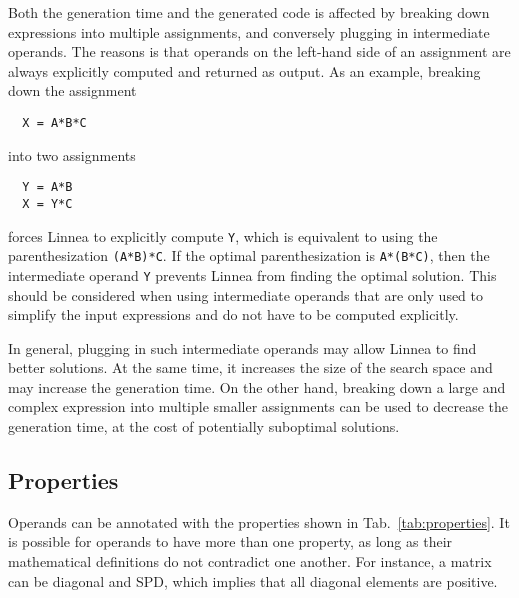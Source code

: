\documentclass[
  12pt,
  a4paper,
]{scrartcl}
\begin{document}
Both the generation time and the generated code is affected by breaking down expressions into multiple assignments, and conversely plugging in intermediate operands.
The reasons is that operands on the left-hand side of an assignment are always explicitly computed and returned as output.
As an example, breaking down the assignment
\begin{verbatim}
  X = A*B*C
\end{verbatim}
into two assignments
\begin{verbatim}
  Y = A*B
  X = Y*C
\end{verbatim}
forces Linnea to explicitly compute \texttt{Y}, which is equivalent to using the parenthesization \texttt{(A*B)*C}. If the optimal parenthesization is \texttt{A*(B*C)}, then the intermediate operand \texttt{Y} prevents Linnea from finding the optimal solution. This should be considered when using intermediate operands that are only used to simplify the input expressions and do not have to be computed explicitly.

In general, plugging in such intermediate operands may allow Linnea to find better solutions. At the same time, it increases the size of the search space and may increase the generation time. On the other hand, breaking down a large and complex expression into multiple smaller assignments can be used to decrease the generation time, at the cost of potentially suboptimal solutions.

\subsection{Properties}
\label{sec:properties}

Operands can be annotated with the properties shown in Tab.~\ref{tab:properties}.
It is possible for operands to have more than one property, as long as their mathematical definitions do not contradict one another. For instance, a matrix can be diagonal and SPD, which implies that all diagonal elements are positive. 
\end{document}
